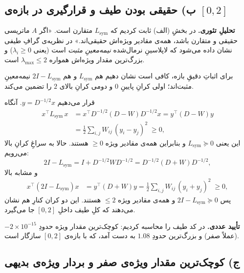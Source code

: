 \documentclass[14pt]{extarticle}
\newcommand{\T}{^{\top}}
\begin{document}
\subsection{ب) حقیقی بودن طیف و قرارگیری در بازه‌ی \texorpdfstring{$[0,2]$}{[0,2]}}

\noindent\textbf{تحلیلِ تئوری.}
در بخشِ (الف) ثابت کردیم که $L_{\mathrm{sym}}$ متقارن است. «اگر $A$ ماتریسی حقیقی و متقارن باشد، همه‌ی مقادیر ویژه‌اش حقیقی‌اند.» در نظریه‌ی گرافِ طیفی نشان داده می‌شود که لاپلاسینِ نرمال‌شده \emph{نیمه‌معینِ مثبت} است (یعنی $\lambda_i\ge 0$) و بزرگ‌ترین مقدار ویژه‌اش همواره $\lambda_{\max}\le 2$ است.

\smallskip
\noindent برای اثباتِ دقیقِ بازه، کافی است نشان دهیم هم $L_{\mathrm{sym}}$ و هم $2I-L_{\mathrm{sym}}$
نیمه‌معینِ مثبت‌اند؛ اولی کرانِ پایینِ $0$ و دومی کرانِ بالای $2$ را تضمین می‌کند.

\begin{proofx}
قرار می‌دهیم $y=D^{-1/2}x$. آنگاه
\begin{align*}
x\T L_{\mathrm{sym}}\,x
&= x\T D^{-1/2}(D-W)D^{-1/2}x = y\T(D-W)y\\
&=\tfrac12\sum_{i,j}W_{ij}\,(y_i-y_j)^2\;\ge 0 ,
\end{align*}
این یعنی $L_{\mathrm{sym}}\succeq 0$ و بنابراین همه‌ی مقادیر ویژه $\ge 0$ هستند.
حالا به سراغِ کرانِ بالا می‌رویم:
\[
2I-L_{\mathrm{sym}} = I + D^{-1/2}W D^{-1/2}=D^{-1/2}(D+W)D^{-1/2},
\]
و مشابه بالا
\begin{align*}
x\T(2I-L_{\mathrm{sym}})x
&= y\T(D+W)y=\tfrac12\sum_{i,j}W_{ij}\,(y_i+y_j)^2\;\ge 0 ,
\end{align*}
پس $2I-L_{\mathrm{sym}}\succeq 0$ و همه‌ی مقادیر ویژه $\le 2$ هستند. این دو کران کنارِ هم نشان می‌دهند که کلِ طیف داخلِ $[0,2]$ جا می‌گیرد.
\end{proofx}

\noindent\textbf{تأیید عددی.} در کد طیف را محاسبه کردیم: کوچک‌ترین مقدار ویژه حدودِ $-2\times10^{-15}$
(عملاً صفر) و بزرگ‌ترین حدودِ $1.08$ به دست آمد، که با بازه‌ی $[0,2]$ سازگار است.

\subsection{ج) کوچک‌ترین مقدار ویژه‌ی صفر و بردار ویژه‌ی بدیهی}
\end{document}
